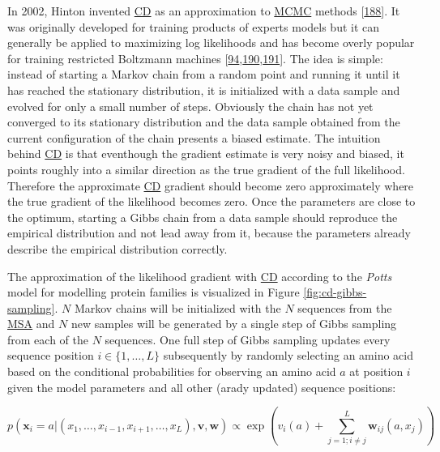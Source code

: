 \documentclass[11pt,a4paper,twoside]{book}
\newcommand{\seq}{\mathbf{x}}
\renewcommand{\v}{\mathbf{v}}
\newcommand{\vi}{v_{i}}
\newcommand{\w}{\mathbf{w}}
\newcommand{\wij}{\mathbf{w}_{ij}}
\theoremstyle{definition}
\theoremstyle{definition}
\theoremstyle{remark}
\begin{document}
In 2002, Hinton invented \protect\hyperlink{abbrev}{CD} as an
approximation to \protect\hyperlink{abbrev}{MCMC} methods
{[}\protect\hyperlink{ref-Hinton2002}{188}{]}. It was originally
developed for training products of experts models but it can generally
be applied to maximizing log likelihoods and has become overly popular
for training restricted Boltzmann machines
{[}\protect\hyperlink{ref-Murphy2012}{94},\protect\hyperlink{ref-Fischer2012}{190},\protect\hyperlink{ref-Bengio2009}{191}{]}.
The idea is simple: instead of starting a Markov chain from a random
point and running it until it has reached the stationary distribution,
it is initialized with a data sample and evolved for only a small number
of steps. Obviously the chain has not yet converged to its stationary
distribution and the data sample obtained from the current configuration
of the chain presents a biased estimate. The intuition behind
\protect\hyperlink{abbrev}{CD} is that eventhough the gradient estimate
is very noisy and biased, it points roughly into a similar direction as
the true gradient of the full likelihood. Therefore the approximate
\protect\hyperlink{abbrev}{CD} gradient should become zero approximately
where the true gradient of the likelihood becomes zero. Once the
parameters are close to the optimum, starting a Gibbs chain from a data
sample should reproduce the empirical distribution and not lead away
from it, because the parameters already describe the empirical
distribution correctly.

The approximation of the likelihood gradient with
\protect\hyperlink{abbrev}{CD} according to the \emph{Potts} model for
modelling protein families is visualized in Figure
\ref{fig:cd-gibbs-sampling}. \(N\) Markov chains will be initialized
with the \(N\) sequences from the \protect\hyperlink{abbrev}{MSA} and
\(N\) new samples will be generated by a single step of Gibbs sampling
from each of the \(N\) sequences. One full step of Gibbs sampling
updates every sequence position \(i \in \{1, \ldots, L\}\) subsequently
by randomly selecting an amino acid based on the conditional
probabilities for observing an amino acid \(a\) at position \(i\) given
the model parameters and all other (arady updated) sequence positions:

\begin{equation}
  p(\seq_i = a | (x_1, \ldots, x_{i-1}, x_{i+1}, \ldots, x_L), \v, \w) \propto \exp \left( \vi(a) + \sum_{j=1; i \ne j}^L \wij(a, x_j)  \right)
\label{eq:conditional-prob-full-likelihood}
\end{equation}
\end{document}
